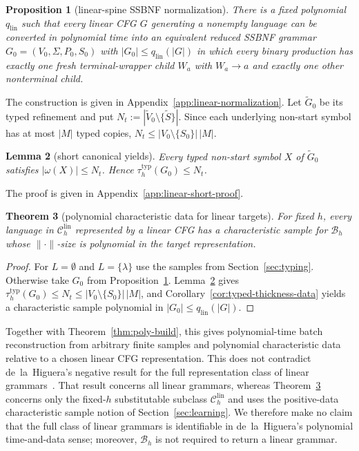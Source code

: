 \documentclass[11pt,a4paper]{article}
\newtheorem{theorem}{Theorem}[section]
\newtheorem{lemma}[theorem]{Lemma}
\newtheorem{proposition}[theorem]{Proposition}
\theoremstyle{remark}
\theoremstyle{plain}
\newcommand{\lin}{\mathrm{lin}}
\newcommand{\Clin}[1]{\mathcal C_{#1}^{\lin}}
\begin{document}
\begin{proposition}[linear-spine SSBNF normalization]\label{prop:linear-normal}
There is a fixed polynomial $q_{\mathrm{lin}}$ such that every linear CFG
$G$ generating a nonempty language can be converted in polynomial time into
an equivalent reduced SSBNF grammar $G_0=(V_0,\Sigma,P_0,S_0)$ with
$|G_0|\le q_{\mathrm{lin}}(|G|)$ in which every binary production has
exactly one fresh terminal-wrapper child $W_a$ with $W_a\to a$ and exactly
one other nonterminal child.
\end{proposition}

The construction is given in Appendix~\ref{app:linear-normalization}.  Let
$\widetilde G_0$ be its typed refinement and put
$N_t:=|\widetilde V_0\setminus\{\widetilde S\}|$.  Since each underlying
non-start symbol has at most $|M|$ typed copies,
$N_t\le|V_0\setminus\{S_0\}|\,|M|$.

\begin{lemma}[short canonical yields]\label{lem:linear-short}
Every typed non-start symbol $X$ of $\widetilde G_0$ satisfies
$|\omega(X)|\le N_t$.
Hence $\tau_h^{\mathrm{typ}}(G_0)\le N_t$.
\end{lemma}

The proof is given in Appendix~\ref{app:linear-short-proof}.

\begin{theorem}[polynomial characteristic data for linear targets]
\label{thm:linear-poly}
For fixed $h$, every language in $\Clin{h}$ represented by a linear CFG has a
characteristic sample for $\mathcal B_h$ whose $\|\cdot\|$-size is
polynomial in the target representation.
\end{theorem}

\begin{proof}
For $L=\emptyset$ and $L=\{\lambda\}$ use the samples from
Section~\ref{sec:typing}.  Otherwise take $G_0$ from
Proposition~\ref{prop:linear-normal}.  Lemma~\ref{lem:linear-short} gives
$\tau_h^{\mathrm{typ}}(G_0)\le N_t\le
|V_0\setminus\{S_0\}|\,|M|$, and
Corollary~\ref{cor:typed-thickness-data} yields a characteristic sample
polynomial in $|G_0|\le q_{\mathrm{lin}}(|G|)$.
\end{proof}

Together with Theorem~\ref{thm:poly-build}, this gives polynomial-time batch
reconstruction from arbitrary finite samples and polynomial characteristic
data relative to a chosen linear CFG representation.  This does not contradict
de~la~Higuera's negative result for the full representation class of linear
grammars~\cite[Theorem~2]{higuera1997}.  That result concerns all linear
grammars, whereas Theorem~\ref{thm:linear-poly} concerns only the fixed-$h$
substitutable subclass $\Clin{h}$ and uses the positive-data characteristic
sample notion of Section~\ref{sec:learning}.  We therefore make no claim that
the full class of linear grammars is identifiable in de~la~Higuera's
polynomial time-and-data sense; moreover, $\mathcal B_h$ is not required to
return a linear grammar.
\end{document}
